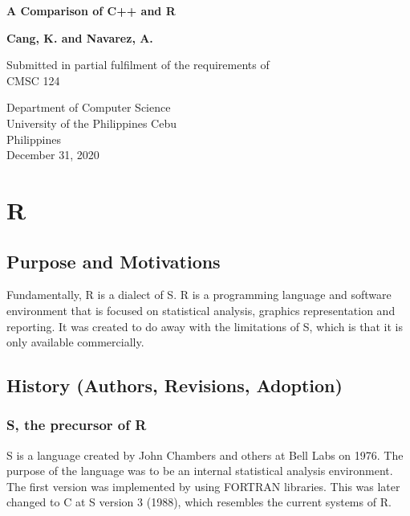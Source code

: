 \documentclass[12pt]{article}
\begin{document}
\begin{titlepage}
    \begin{center}
        \vspace*{1cm}

        \Huge
        \textbf{A Comparison of C++ and R}

        \vspace{1.5cm}
        \large
        \textbf{Cang, K. and Navarez, A.}

        \vspace{0.8cm}

        Submitted in partial fulfilment of the requirements of\\
        CMSC 124


        \vfill
            
        Department of Computer Science\\
        University of the Philippines Cebu\\
        Philippines\\
        December 31, 2020

    \end{center}
\end{titlepage}
\newpage
\tableofcontents
\newpage

\section{R}
\subsection{Purpose and Motivations}
Fundamentally, R is a dialect of S. R is a programming language and software environment that is focused on statistical analysis, graphics representation and reporting. It was created to do away with the limitations of S, which is that it is only available commercially.
\subsection{History (Authors, Revisions, Adoption)}
\subsubsection{S, the precursor of R}
S is a language created by John Chambers and others at Bell Labs on 1976. The purpose of the language was to be an internal statistical analysis environment. The first version was implemented by using FORTRAN libraries. This was later changed to C at S version 3 (1988), which resembles the current systems of R.
\end{document}

